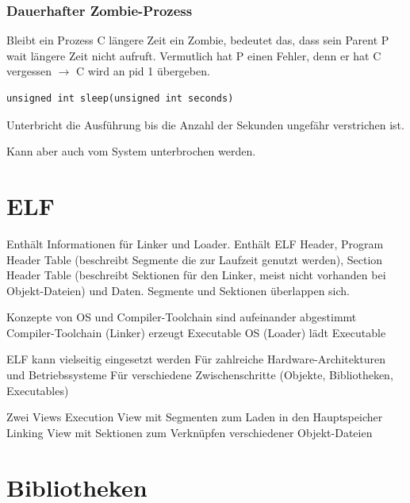 \begin{multicols*}{5}
	\subsubsection{Dauerhafter Zombie-Prozess}
			Bleibt ein Prozess C längere Zeit ein Zombie, bedeutet das, dass sein Parent P wait längere Zeit nicht aufruft. Vermutlich hat P einen Fehler, denn er hat C vergessen $\rightarrow$ C wird an pid 1 übergeben.
	

	\vspace{-5pt}		

	\begin{lstlisting}
unsigned int sleep(unsigned int seconds)
	\end{lstlisting}
	\vspace{-5pt}
	\begin{compactitem}[$\bullet$]
		\item Unterbricht die Ausführung bis die Anzahl der Sekunden ungefähr verstrichen ist. 
		\item Kann aber auch vom System unterbrochen werden.	
	\end{compactitem}
	
	
	
	
	


	
\columnbreak


\section{ELF}

Enthält Informationen für Linker und Loader. 
Enthält ELF Header, Program Header Table (beschreibt Segmente die zur Laufzeit genutzt werden),
Section Header Table (beschreibt Sektionen für den Linker, meist nicht vorhanden bei Objekt-Dateien) und Daten.
Segmente und Sektionen überlappen sich.

Konzepte von OS und Compiler-Toolchain sind aufeinander abgestimmt
Compiler-Toolchain (Linker) erzeugt Executable
OS (Loader) lädt Executable 

ELF kann vielseitig eingesetzt werden
Für zahlreiche Hardware-Architekturen und Betriebssysteme
Für verschiedene Zwischenschritte (Objekte, Bibliotheken, Executables) 

Zwei Views
Execution View mit Segmenten zum Laden in den Hauptspeicher
Linking View mit Sektionen zum Verknüpfen verschiedener Objekt-Dateien

\vspace{-6pt}
\section{Bibliotheken}


\end{multicols*}

